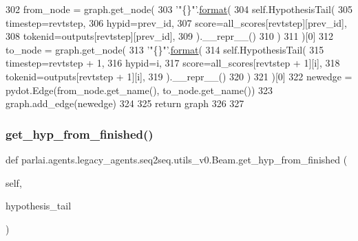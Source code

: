 \begin{DoxyCode}
302                 from\_node = graph.get\_node(
303                     \textcolor{stringliteral}{'"\{\}"'}.\hyperlink{namespaceparlai_1_1chat__service_1_1services_1_1messenger_1_1shared__utils_a32e2e2022b824fbaf80c747160b52a76}{format}(
304                         self.HypothesisTail(
305                             timestep=revtstep,
306                             hypid=prev\_id,
307                             score=all\_scores[revtstep][prev\_id],
308                             tokenid=outputs[revtstep][prev\_id],
309                         ).\_\_repr\_\_()
310                     )
311                 )[0]
312                 to\_node = graph.get\_node(
313                     \textcolor{stringliteral}{'"\{\}"'}.\hyperlink{namespaceparlai_1_1chat__service_1_1services_1_1messenger_1_1shared__utils_a32e2e2022b824fbaf80c747160b52a76}{format}(
314                         self.HypothesisTail(
315                             timestep=revtstep + 1,
316                             hypid=i,
317                             score=all\_scores[revtstep + 1][i],
318                             tokenid=outputs[revtstep + 1][i],
319                         ).\_\_repr\_\_()
320                     )
321                 )[0]
322                 newedge = pydot.Edge(from\_node.get\_name(), to\_node.get\_name())
323                 graph.add\_edge(newedge)
324 
325         \textcolor{keywordflow}{return} graph
326 
327 
\end{DoxyCode}
\mbox{\label{classparlai_1_1agents_1_1legacy__agents_1_1seq2seq_1_1utils__v0_1_1Beam_a2df9b1e26c3f35c7149e4d7ae75c2f03}} 
\subsubsection{\texorpdfstring{get\+\_\+hyp\+\_\+from\+\_\+finished()}{get\_hyp\_from\_finished()}}
{\footnotesize\ttfamily def parlai.\+agents.\+legacy\+\_\+agents.\+seq2seq.\+utils\+\_\+v0.\+Beam.\+get\+\_\+hyp\+\_\+from\+\_\+finished (\begin{DoxyParamCaption}\item[{}]{self,  }\item[{}]{hypothesis\+\_\+tail }\end{DoxyParamCaption})}

